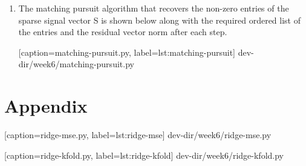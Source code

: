 \documentclass{article}
\begin{document}
\begin{enumerate}[leftmargin={*}, font={\bf}, label={\arabic*.}, ref={\arabic*}]
\begin{enumerate}[label={(\Alph*)}, ref={\theenumi(\Alph*)}]
      \item \label{qst:1F}
        \begin{enumerate}[label={(\roman*)}, ref={\theenumii(\roman*)}]
          \item
            Below is a plot with the regularization factor, $\alpha$, on the $x$-axis
            ($\log$ scale) and the mean test error across the five splits on the $y$-axis.
            See \autoref{lst:ridge-kfold} for a fuller explanation on how this figure
            has been generated.
            \begin{figure}[H]
              \centering
            \end{figure}
          
          \item
            After tuning $\alpha$ via cross-validation, we should evaluate the model
            on a separate test set that was not involved in training or hyperparameter
            tuning. This yields a less biased estimate of how well the model performs
            on unseen data.
        \end{enumerate}
    \end{enumerate}

  \item \label{qst:2}
    The matching pursuit algorithm that recovers the non-zero entries of the sparse
    signal vector {\sf S} is shown below along with the required ordered list of the
    entries and the residual vector norm after each step.
    
      [caption={\sf matching-pursuit.py}, label={lst:matching-pursuit}]
      {dev-dir/week6/matching-pursuit.py}
\end{enumerate}

\newpage

\section*{Appendix}


  [caption={\sf ridge-mse.py}, label={lst:ridge-mse}]
  {dev-dir/week6/ridge-mse.py}
  

  [caption={\sf ridge-kfold.py}, label={lst:ridge-kfold}]
  {dev-dir/week6/ridge-kfold.py}
\end{document}
